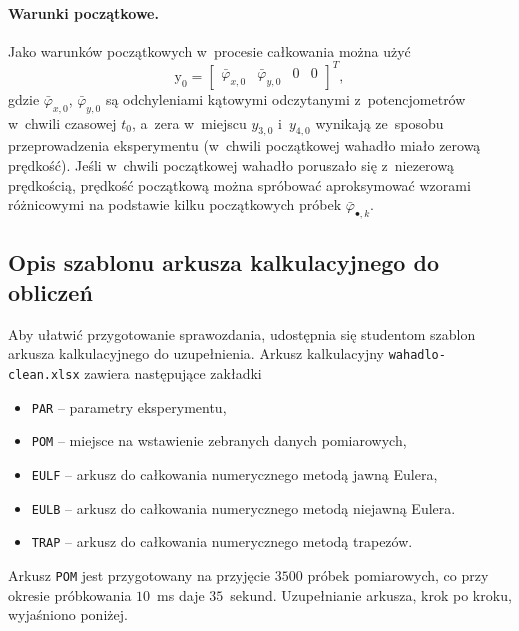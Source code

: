 \documentclass[paper=a4,DIV=12]{tmmlab}
\newcommand{\brm}[1]{\bm{\mathrm{#1}}}
\begin{document}
\paragraph{Warunki początkowe.}
Jako warunków początkowych w~procesie całkowania można użyć
\begin{equation}
  \brm{y}_0 = \begin{bmatrix}
    \bar{\varphi}_{x,0} & \bar{\varphi}_{y,0} & 0 & 0
  \end{bmatrix}^T,
\end{equation}
gdzie $\bar{\varphi}_{x,0}$, $\bar{\varphi}_{y,0}$ są odchyleniami kątowymi
odczytanymi z~potencjometrów w~chwili czasowej $t_0$, a~zera w~miejscu
$y_{3,0}$ i~$y_{4,0}$ wynikają ze~sposobu przeprowadzenia eksperymentu
(w~chwili początkowej wahadło miało zerową prędkość). Jeśli w~chwili
początkowej wahadło poruszało się z~niezerową prędkością, prędkość początkową
można spróbować aproksymować wzorami różnicowymi na podstawie kilku
początkowych próbek $\bar{\varphi}_{\bullet,k}$.

\subsection{Opis szablonu arkusza kalkulacyjnego do obliczeń}
\label{sec:CS7OJ}

Aby ułatwić przygotowanie sprawozdania, udostępnia się studentom szablon
arkusza kalkulacyjnego do uzupełnienia. Arkusz kalkulacyjny
\texttt{wahadlo-clean.xlsx} zawiera następujące zakładki
\begin{itemize}
  \item \texttt{PAR} -- parametry eksperymentu,
  \item \texttt{POM} -- miejsce na wstawienie zebranych danych pomiarowych,
  \item \texttt{EULF} -- arkusz do całkowania numerycznego metodą jawną Eulera,
  \item \texttt{EULB} -- arkusz do całkowania numerycznego metodą niejawną Eulera.
  \item \texttt{TRAP} -- arkusz do całkowania numerycznego metodą trapezów.
\end{itemize}

Arkusz \texttt{POM} jest przygotowany na przyjęcie $3500$ próbek pomiarowych,
co przy okresie próbkowania $10$~ms daje $35$~sekund. Uzupełnianie arkusza,
krok po kroku, wyjaśniono poniżej.
\end{document}
